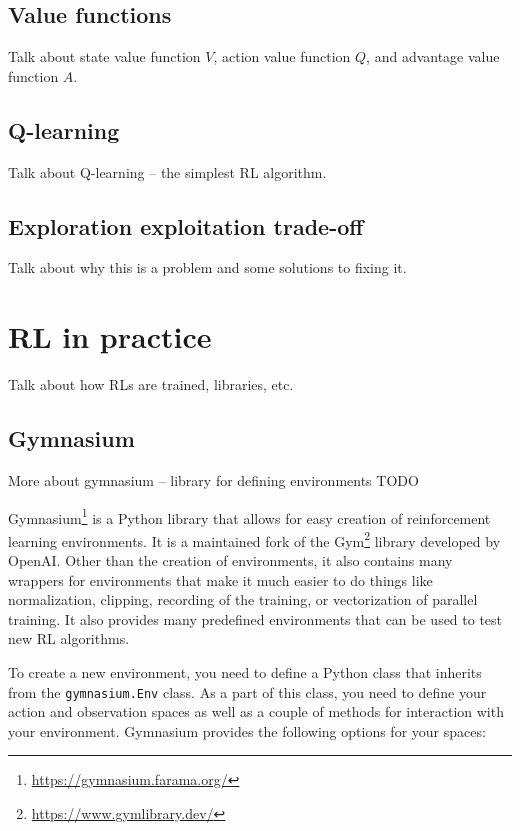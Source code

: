 \documentclass[
  digital,     %
  oneside,     %
  nosansbold,  %
  nocolorbold, %
  lof,         %
  lot,         %
]{fithesis4}
\begin{document}
\section{Value functions}
Talk about state value function $V$, action value function $Q$, and advantage value function $A$.

\section{Q-learning}
Talk about Q-learning -- the simplest RL algorithm.

\section{Exploration exploitation trade-off}
Talk about why this is a problem and some solutions to fixing it.

\chapter{RL in practice}
Talk about how RLs are trained, libraries, etc.

\section{Gymnasium}
More about gymnasium -- library for defining environments TODO

Gymnasium\footnote{\url{https://gymnasium.farama.org/}} is a Python library that allows for easy creation of reinforcement learning environments. It is a maintained fork of the Gym\footnote{\url{https://www.gymlibrary.dev/}} library developed by OpenAI. Other than the creation of environments, it also contains many wrappers for environments that make it much easier to do things like normalization, clipping, recording of the training, or vectorization of parallel training. It also provides many predefined environments that can be used to test new RL algorithms.

To create a new environment, you need to define a Python class that inherits from the \verb|gymnasium.Env| class. As a part of this class, you need to define your action and observation spaces as well as a couple of methods for interaction with your environment. Gymnasium provides the following options for your spaces:
\end{document}
